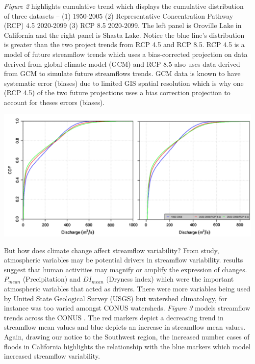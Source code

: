 \documentclass[a4paper,man,biblatex]{apa7}
\begin{document}
\vspace{2ex}
\par \textit{Figure 2} highlights cumulative trend which displays the cumulative distribution of three datasets -- (1) 1950-2005 (2) Representative Concentration Pathway (RCP) 4.5 2020-2099 (3) RCP 8.5 2020-2099. The left panel is Oroville Lake in California and the right panel is Shasta Lake. Notice the blue line's distribution is greater than the two project trends from RCP 4.5 and RCP 8.5. RCP 4.5 is a model of future streamflow trends which uses a bias-corrected projection on data derived from global climate model (GCM) and RCP 8.5 also uses data derived from GCM to simulate future streamflows trends. GCM data is known to have systematic error (biases) due to limited GIS spatial resolution which is why one (RCP 4.5) of the two future projections uses a bias correction projection to account for theses errors (biases).\\
\begin{minipage}{0.65\linewidth}   
    \centering
    \includegraphics[scale=0.40]{cdf_streamflow.png}
\end{minipage}
\vspace{2ex}
\par But how does climate change affect streamflow variability? From \textcite{rice_2016} study, atmospheric variables may be potential drivers in streamflow variability. \textcite{rice_2016} results suggest that human activities may magnify or amplify the expression of changes. $P_\textit{mean}$ (Precipitation) and $DI_\textit{mean}$ (Dryness index) which were the important atmospheric variables that acted as drivers. There were more variables being used by United State Geological Survey (USGS) but watershed climatology, for instance was too varied amongst CONUS watersheds. \textit{Figure 3} models streamflow trends across the CONUS \autocite{rice_2016}. The red markers depict a decreasing trend in streamflow mean values and blue depicts an increase in streamflow mean values. Again, drawing our notice to the Southwest region, the increased number cases of floods in California highlights the relationship with the blue markers which model increased streamflow variability. \\
\end{document}
